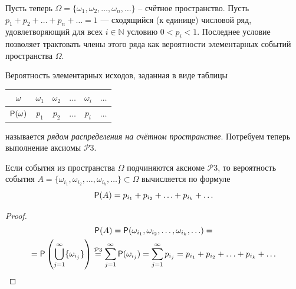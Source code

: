 Пусть теперь $\Omega = \{\omega_1 , \omega_2 , \ldots , \omega_n , \ldots \}$ – счётное пространство. Пусть $p_1 + p_2 + \ldots + p_n + \ldots = 1$ — сходящийся (к единице) числовой ряд, удовлетворяющий
для всех $i \in \mathbb{N}$ условию $0 < p_i < 1$. Последнее условие позволяет трактовать члены этого ряда как вероятности элементарных событий пространства $\Omega$.

\begin{definition}
	\label{def:4.12}
Вероятность элементарных исходов, заданная в виде таблицы
\begin{center}
	\begin{tabular}{|c|c|c|c|c|c|}
		\hline
		$\omega$ & $\omega_1$ & $\omega_2$ & $\ldots$ & $\omega_i$ & $\ldots$ \\ \hline
		$\P(\omega)$  & $p_1$ & $p_2$ & $\ldots$  & $p_i$ & $\ldots$ \\ \hline
	\end{tabular}
\end{center}
называется \textit{рядом распределения на счётном пространстве}.
Потребуем теперь выполнение аксиомы $\mathcal{P}3$.
\end{definition}

\begin{lemma}
	\label{lemma:4.13}
Если события из пространства $\Omega$ подчиняются аксиоме $\mathcal{P}3$, то вероятность события $A = \{\omega_{i_1} , \omega_{i_2} , \ldots , \omega_{i_k} , \ldots \} \subset \Omega$ вычисляется по формуле
$$\P (A) = p_{i_1} + p_{i_2} + \ldots + p_{i_k} + \ldots$$
\end{lemma}

\begin{proof}
\begin{gather*}
	\P(A) = \P(\omega_{i_1},\omega_{i_2}, \ldots, \omega_{i_k}, \ldots) =\\= \P \left( \bigcup_{j=1}^\infty \{ \omega_{i_j}\} \right) \stackrel{\mathcal{P}3}{=} \sum_{j=1}^{\infty} \P(\omega_{i_j}) = \sum_{j=1}^{\infty} p_{i_j} = p_{i_1} + p_{i_2} + \ldots + p_{i_k} + \ldots 
\end{gather*}
	
\end{proof}

